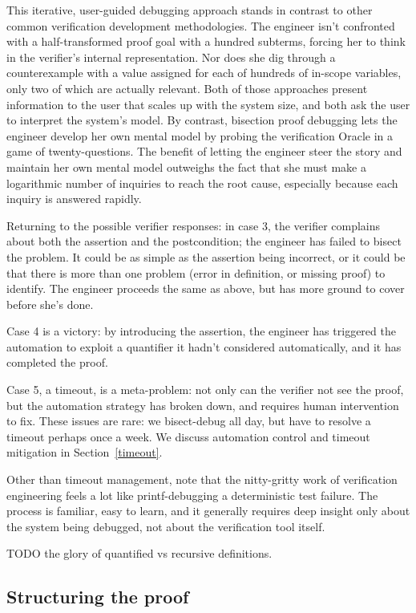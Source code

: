 This iterative, user-guided debugging approach stands in contrast to other
common verification development methodologies.
The engineer isn't confronted with a half-transformed proof goal
with a hundred subterms, forcing her to
think in the verifier's internal representation.
Nor does she dig through a counterexample with a value assigned for each
of hundreds of in-scope variables, only two of which are actually relevant.
Both of those approaches present information to the user that scales up with
the system size, and both ask the user to interpret the system's model.
By contrast, bisection proof debugging lets the engineer develop her own
mental model by probing the verification Oracle in a game of twenty-questions.
The benefit of letting the engineer steer the story and maintain her own
mental model outweighs the fact that she must make a logarithmic number of
inquiries to reach the root cause, especially because each inquiry is answered
rapidly.


Returning to the possible verifier responses: in case 3, the verifier
complains about both the assertion and the postcondition; the engineer
has failed to bisect the problem. It could be as simple as the assertion
being incorrect, or it could be that there is more than one problem
(error in definition, or missing proof) to identify. The engineer proceeds
the same as above, but has more ground to cover before she's done.

Case 4 is a victory: by introducing the assertion, the engineer has
triggered the automation to exploit a quantifier it hadn't considered
automatically, and it has completed the proof.

Case 5, a timeout, is a meta-problem: not only can the verifier not
see the proof, but the automation strategy has broken down, and requires
human intervention to fix. These issues are rare: we bisect-debug all day,
but have to resolve a timeout perhaps once a week.
We discuss automation control and timeout mitigation in Section~\ref{timeout}.

Other than timeout management, note that the nitty-gritty work of verification
engineering feels a lot like printf-debugging a deterministic test failure.
The process is familiar, easy to learn, and it generally requires deep insight
only about the system being debugged, not about the verification tool itself.


TODO the glory of quantified vs recursive definitions.

\subsection{Structuring the proof}


